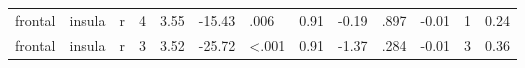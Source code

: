 \documentclass{article}
\begin{document}
\begin{longtable}{llrR{1.3cm}R{1cm}R{1.3cm}R{1cm}R{1cm}R{1.3cm}R{1cm}R{1.8cm}R{1.3cm}R{1.8cm}}
   frontal &                    insula &    r &         4 &                  3.55 &           -15.43 &               .006 &                               0.91 &                         -0.19 &                            .897 &  -0.01 &      1 &      0.24 \\
   frontal &                    insula &    r &         3 &                  3.52 &           -25.72 &      \textless.001 &                               0.91 &                         -1.37 &                            .284 &  -0.01 &      3 &      0.36 \\
\end{longtable}
\end{document}
